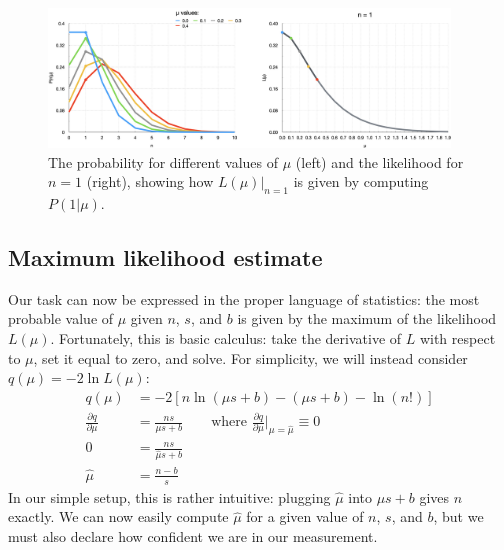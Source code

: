 \begin{figure}[htb]
    \centering
    \includegraphics[width=0.95\textwidth]{fig/stats/prob_vs_like.png}
    \caption[The probability and likelihood]{
        The probability for different values of $\mu$ (left) and the likelihood for $n = 1$ (right), showing how $L(\mu)|_{n=1}$ is given by computing $P(1|\mu)$. 
    }
    \label{fig:prob_vs_like}
\end{figure}

\subsection{Maximum likelihood estimate}
Our task can now be expressed in the proper language of statistics: the most probable value of $\mu$ given $n$, $s$, and $b$ is given by the maximum of the likelihood $L(\mu)$. 
Fortunately, this is basic calculus: take the derivative of $L$ with respect to $\mu$, set it equal to zero, and solve. 
For simplicity, we will instead consider $q(\mu) = -2\ln{L(\mu)}$:
\begin{align}
    q(\mu) &= -2[n\ln(\mu s + b) - (\mu s + b) - \ln{(n!)}] \nonumber \\
    \frac{\partial q}{\partial \mu} &= \frac{ns}{\mu s + b}\qquad\text{where }\frac{\partial q}{\partial \mu}\bigg|_{\mu=\hat{\mu}} \equiv 0 \nonumber \\
    0 &= \frac{ns}{\hat{\mu} s + b} \nonumber \\
    \hat{\mu} &= \frac{n - b}{s}
\end{align}
In our simple setup, this is rather intuitive: plugging $\hat{\mu}$ into $\mu s + b$ gives $n$ exactly. 
We can now easily compute $\hat{\mu}$ for a given value of $n$, $s$, and $b$, but we must also declare how confident we are in our measurement.

